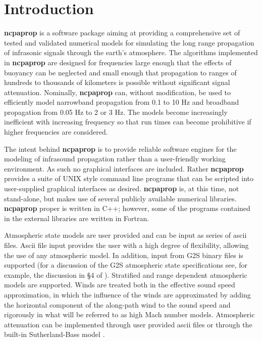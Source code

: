 \section{Introduction}
\label{sec: intro}

\textbf{ncpaprop} is a software package aiming at providing a comprehensive set of tested and validated numerical models for  simulating the long range propagation of infrasonic signals through the earth's atmosphere. The algorithms implemented in \textbf{ncpaprop} are designed for frequencies large enough that the effects of buoyancy can be neglected and small enough that propagation to ranges of hundreds to thousands of kilometers is possible without significant signal attenuation. Nominally,  \textbf{ncpaprop} can, without modification, be used to efficiently model narrowband propagation from 0.1 to 10 Hz and broadband propagation from 0.05 Hz to 2 or 3 Hz. The models become increasingly inefficient with increasing frequency so that run times can become prohibitive if higher frequencies are considered. 

The intent behind \textbf{ncpaprop} is to provide reliable software engines for the modeling of infrasound propagation rather than a user-friendly working environment. As such no graphical interfaces are included. Rather \textbf{ncpaprop} provides a suite of UNIX style command line programs that can be scripted into user-supplied graphical interfaces as desired. \textbf{ncpaprop} is, at this time, not stand-alone, but makes use of several publicly available numerical libraries. \textbf{ncpaprop} proper is written in C++; however, some of the programs contained in the external libraries are written in Fortran. 

Atmospheric state models are user provided and can be input as series of ascii files. Ascii file input provides the user with a high degree of flexibility, allowing the use of any atmospheric model. In addition, input from G2S binary files is supported (for a discussion of the G2S atmospheric state specifications see, for example, the discussion in \S 4 of \cite{non-lin_therm}). Stratified and range dependent atmospheric models are supported. Winds are treated both in the effective sound speed approximation, in which the influence of the winds are approximated by adding the horizontal component of the along-path wind to the sound speed \cite{Pierce,Godin_eff_fluid} and rigorously in what will be referred to as high Mach number models. Atmospheric attenuation can be implemented through user provided ascii files or through the built-in Sutherland-Bass model \cite{bass_suth}.

